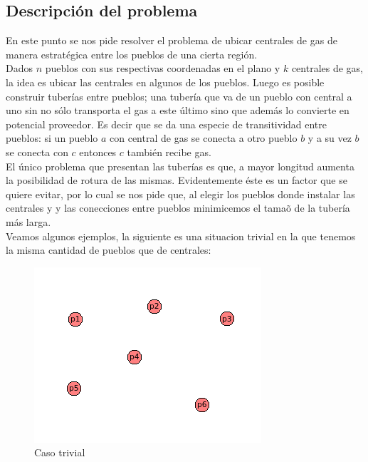 \subsection{Descripci\'on del problema}

En este punto se nos pide resolver el problema de ubicar centrales de gas de manera estrat\'egica entre los pueblos de una cierta regi\'on.\\

Dados $n$ pueblos con sus respectivas coordenadas en el plano y $k$ centrales de gas, la idea es ubicar las centrales en algunos de los pueblos. Luego es posible construir tuber\'ias entre pueblos; una tuber\'ia que va de un pueblo con central a uno sin no s\'olo transporta el gas a este \'ultimo sino que adem\'as lo convierte en potencial proveedor. Es decir que se da una especie de transitividad entre pueblos: si un pueblo $a$ con central de gas se conecta a otro pueblo $b$ y a su vez $b$ se conecta con $c$ entonces $c$ tambi\'en recibe gas.\\

El \'unico problema que presentan las tuber\'ias es que, a mayor longitud aumenta la posibilidad de rotura de las mismas. Evidentemente \'este es un factor que se quiere evitar, por lo cual se nos pide que, al elegir los pueblos donde instalar las centrales y y las conecciones entre pueblos minimicemos el tama\~o de la tuber\'ia m\'as larga.\\

Veamos algunos ejemplos, la siguiente es una situacion trivial en la que tenemos la misma cantidad de pueblos que de centrales:

\begin{figure}[h]
\begin{center}
\includegraphics[scale=0.7]{./img/ej2_explicacion1.png}
\caption{Caso trivial}
\end{center}
\end{figure}

